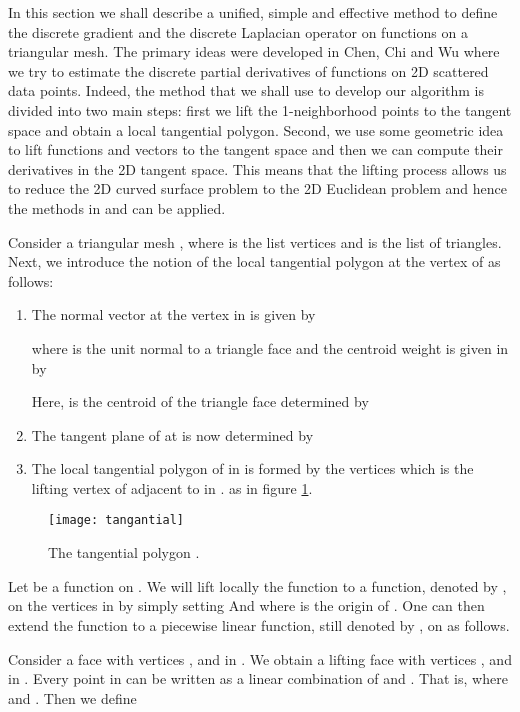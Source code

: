 \documentclass{elsart}
\begin{document}
In this section we shall describe a unified, simple and effective
method to define the discrete gradient and the discrete Laplacian
operator on functions on a triangular mesh. The primary ideas were
developed in Chen, Chi and Wu\cite{Chen3,Chen4} where we try to
estimate the discrete partial derivatives of functions on 2D
scattered data points. Indeed, the method that we shall use to
develop our algorithm is divided into two main steps: first we lift
the 1-neighborhood points to the tangent space and obtain a local
tangential polygon. Second, we use some geometric idea to lift
functions and vectors to the tangent space and then we can compute
their derivatives in the 2D tangent space. This means that the
lifting process allows us to reduce the 2D curved surface problem to
the 2D Euclidean problem and hence the methods in \cite{Chen4}
and\cite{Hiroshi} can be applied.



Consider a triangular mesh , where  is the list vertices and  is the list of triangles. Next, we introduce the notion  of
the local tangential polygon  at the vertex   of  as
follows:
\begin{enumerate}
\item The normal vector  at the vertex  in  is given by

where  is the unit normal to a triangle face  and the
centroid weight is given in \cite{Chen1} by

Here,  is the centroid of the triangle face  determined by

\item The tangent plane  of  at  is now determined by

\item The local tangential polygon  of  in  is formed by the vertices  which is the lifting vertex of  adjacent to  in .
 as in figure
\ref{tangential}.
\end{enumerate}

\begin{figure}
{\center
\texttt{[image: tangantial]}
\caption{ The tangential polygon .} \label{tangential}
 }
\end{figure}

Let  be a function on . We will lift locally the function 
to a function, denoted by , on the vertices
 in  by simply setting
 And  where  is the origin of
. One can then extend the function  to a
piecewise linear function, still denoted by , on 
as follows.

Consider a face  with vertices ,  and  in . We
obtain a lifting face  with vertices ,
 and   in . Every point   in
 can be written as a linear combination of 
and  . That is,  where
 and . Then we define
\end{document}
